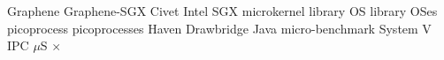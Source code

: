 \documentclass[12pt]{report}
\makeatletter
\newcommand{\thesisauthor}{Chia-Che Tsai}
\newcommand*{\declarecommand}{%
  \@star@or@long\declare@command
}
\newcommand*{\declare@command}[1]{%
  \provide@command{#1}{}%
  \renew@command{#1}%
}
\makeatother
\begin{document}


\declarecommand{\graphene}{Graphene}
\declarecommand{\graphenesgx}{Graphene-SGX}
\declarecommand{\civet}{Civet}
\declarecommand{\intel}{Intel}
\declarecommand{\sgx}{SGX}
\declarecommand{\microkernel}{microkernel}
\declarecommand{\libos}{library OS}
\declarecommand{\liboses}{library OSes}
\declarecommand{\picoproc}{picoprocess}
\declarecommand{\picoprocs}{picoprocesses}
\declarecommand{\haven}{Haven}
\declarecommand{\drawbridge}{Drawbridge}
\declarecommand{\java}{Java}
\declarecommand{\microbench}{micro-benchmark}
\declarecommand{\sysvipc}{System V IPC}
\declarecommand{\us}{$\mu$S}
\declarecommand{\x}{$\times$}


\newpage
{}
\setcounter{page}{2}
\end{document}
